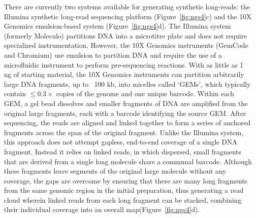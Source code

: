 There are currently two systems available for generating synthetic long-reads: the Illumina synthetic long-read sequencing platform (Figure~\ref{fig:ngs4}c) and the 10X Genomics emulsion-based system (Figure~\ref{fig:ngs4}d). The Illumina 
system (formerly Moleculo) partitions DNA into a microtitre plate and does not require specialized instrumentation. However, the 10X Genomics instruments (GemCode and Chromium) use emulsion to partition DNA and require the use of a microfluidic instrument 
to perform pre-sequencing reactions. With as little as 1 ng of starting material, the 10X Genomics instruments can partition arbitrarily large DNA fragments, up to ~100 kb, into micelles called ‘GEMs’, which typically contain $\leq 0.3\times$ copies of the genome and one unique 
barcode. Within each GEM, a gel bead dissolves and smaller fragments of DNA are amplified from the original large fragments, each with a barcode identifying the source GEM. After sequencing, the reads are aligned and linked together to form a series of anchored 
fragments across the span of the original fragment. Unlike the Illumina system, this approach does not attempt gapless, end-to-end coverage of a single DNA fragment. Instead it relies on linked reads, in which dispersed, small fragments that are derived from a single long molecule 
share a communal barcode. Although these fragments leave segments of the original large molecule without any coverage, the gaps are overcome by ensuring that there are many long fragments from the same genomic region in the initial preparation, thus generating a 
read cloud wherein linked reads from each long fragment can be stacked, combining their individual coverage into an overall map(Figure~\ref{fig:ngs4}d).

